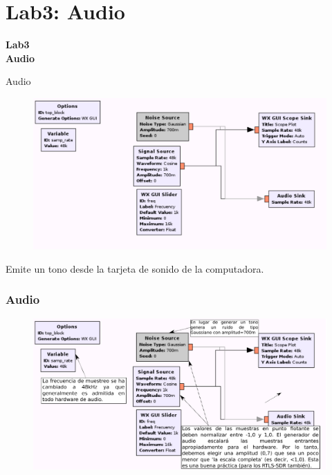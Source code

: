 \section{Lab3: Audio}
\begin{frame}{}


\bfseries{\textrm{\LARGE Lab3\\ \Large Audio}}
\raggedright
\end{frame}

\begin{frame}{Audio}


\begin{figure}
\includegraphics[width=\textwidth, height=0.4\textwidth]{lab3/pdf/lab30.pdf}
\end{figure}

\justifying
Emite un tono desde la tarjeta de sonido de la computadora.

\end{frame}


\begin{frame}[fragile]
\frametitle{Audio}
\justifying

\begin{figure}

\begin{center}
\includegraphics[width=\textwidth]{lab3/pdf/lab31.pdf}
\end{center}
\end{figure}
\end{frame}


